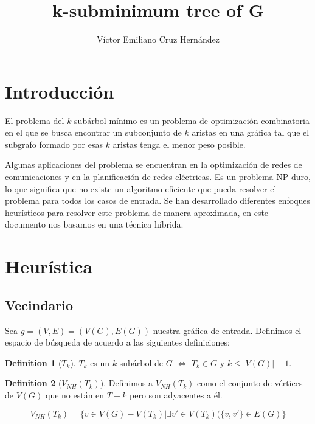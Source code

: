 \documentclass[letter,10pt]{article}
\title{k-subminimum tree of G}
\author{Víctor Emiliano Cruz Hernández}
\theoremstyle{definition}
\newtheorem{definition}{Definition}[section]
\begin{document}
\maketitle


\section{Introducción}

El problema del $k$-subárbol-mínimo es un problema de optimización combinatoria en el que se busca encontrar un subconjunto de $k$ aristas en una gráfica tal que el subgrafo formado por esas $k$ aristas tenga el menor peso posible. 

Algunas aplicaciones del problema se encuentran en la optimización de redes de comunicaciones y en la planificación de redes eléctricas. Es un problema NP-duro, lo que significa que no existe un algoritmo eficiente que pueda resolver el problema para todos los casos de entrada. Se han desarrollado diferentes enfoques heurísticos para resolver este problema de manera aproximada, en este documento nos basamos en una técnica híbrida.
\section{Heurística}

\subsection{Vecindario}
Sea $g=(V,E)=(V(G),E(G))$ nuestra gráfica de entrada. Definimos el espacio de búsqueda de acuerdo a las siguientes definiciones:
\begin{definition}[$T_k$] $T_k$ es un $k$-subárbol de $G$ $\Leftrightarrow$ $T_k \in G$ y $k\leq |V(G)|-1$.
\end{definition}

\begin{definition}[$V_{NH}(T_k)$] Definimos a $V_{NH}(T_k)$ como el conjunto de vértices de $V(G)$ que no están en $T-k$ pero son adyacentes a él.

\[V_{NH}(T_k) = \{v \in V(G)-V(T_k) | \exists v'\in V(T_k)( \{v,v'\} \in E(G)\} \]
\end{definition}
\end{document}
